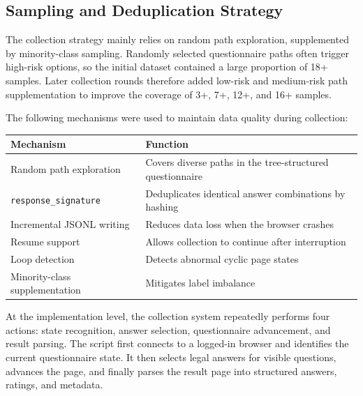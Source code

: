\documentclass[UTF8,a4paper,12pt]{ctexart}
\newcounter{none}
\begin{document}
\subsection{Sampling and Deduplication Strategy}\label{sampling-and-deduplication-strategy}

The collection strategy mainly relies on random path exploration, supplemented by minority-class sampling. Randomly selected questionnaire paths often trigger high-risk options, so the initial dataset contained a large proportion of 18+ samples. Later collection rounds therefore added low-risk and medium-risk path supplementation to improve the coverage of 3+, 7+, 12+, and 16+ samples.

The following mechanisms were used to maintain data quality during collection:

{\def\LTcaptype{none} %
\begin{longtable}[]{@{}
  >{\raggedright\arraybackslash}p{}
  >{\raggedright\arraybackslash}p{}@{}}
\toprule\noalign{}
\begin{minipage}[b]{\linewidth}\raggedright
Mechanism
\end{minipage} & \begin{minipage}[b]{\linewidth}\raggedright
Function
\end{minipage} \\
\midrule\noalign{}
\endhead
\bottomrule\noalign{}
\endlastfoot
Random path exploration & Covers diverse paths in the tree-structured questionnaire \\
\texttt{response\_signature} & Deduplicates identical answer combinations by hashing \\
Incremental JSONL writing & Reduces data loss when the browser crashes \\
Resume support & Allows collection to continue after interruption \\
Loop detection & Detects abnormal cyclic page states \\
Minority-class supplementation & Mitigates label imbalance \\
\end{longtable}
}

At the implementation level, the collection system repeatedly performs four actions: state recognition, answer selection, questionnaire advancement, and result parsing. The script first connects to a logged-in browser and identifies the current questionnaire state. It then selects legal answers for visible questions, advances the page, and finally parses the result page into structured answers, ratings, and metadata.
\end{document}
